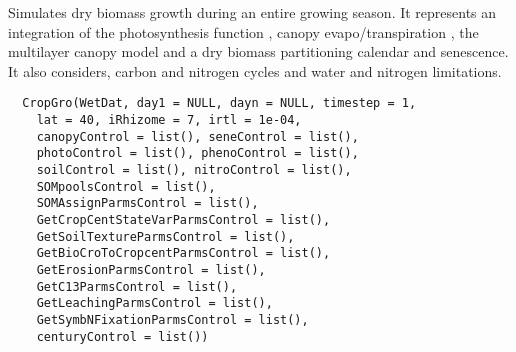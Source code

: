 \documentclass[letterpaper]{book}
\begin{document}
%
\begin{Description}\relax
Simulates dry biomass growth during an entire growing
season.  It represents an integration of the
photosynthesis function , canopy
evapo/transpiration , the multilayer
canopy model  and a dry biomass
partitioning calendar and senescence. It also considers,
carbon and nitrogen cycles and water and nitrogen
limitations.
\end{Description}
%
\begin{Usage}
\begin{verbatim}
  CropGro(WetDat, day1 = NULL, dayn = NULL, timestep = 1,
    lat = 40, iRhizome = 7, irtl = 1e-04,
    canopyControl = list(), seneControl = list(),
    photoControl = list(), phenoControl = list(),
    soilControl = list(), nitroControl = list(),
    SOMpoolsControl = list(),
    SOMAssignParmsControl = list(),
    GetCropCentStateVarParmsControl = list(),
    GetSoilTextureParmsControl = list(),
    GetBioCroToCropcentParmsControl = list(),
    GetErosionParmsControl = list(),
    GetC13ParmsControl = list(),
    GetLeachingParmsControl = list(),
    GetSymbNFixationParmsControl = list(),
    centuryControl = list())
\end{verbatim}
\end{Usage}
%
\end{document}
